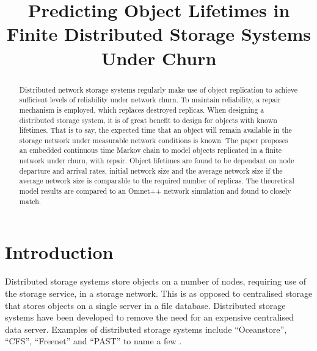 \documentclass[10pt,a4paper,conference]{IEEEtran}
\begin{document}
%
\title{Predicting Object Lifetimes in Finite Distributed Storage Systems Under Churn}

\author{}

\maketitle

\begin{abstract}
Distributed network storage systems regularly make use of object replication to achieve sufficient levels of reliability under network churn. To maintain reliability, a repair mechanism is employed, which replaces destroyed replicas. When designing a distributed storage system, it is of great benefit to design for objects with known lifetimes. That is to say, the expected time that an object will remain available in the storage network under measurable network conditions is known. The paper proposes an embedded continuous time Markov chain to model objects replicated in a finite network under churn, with repair. Object lifetimes are found to be dependant on node departure and arrival rates, initial network size and the average network size if the average network size is comparable to the required number of replicas. The theoretical model results are compared to an Omnet++ network simulation and found to closely match.
\end{abstract}

\section{Introduction}
\label{introduction}

Distributed storage systems store objects on a number of nodes, requiring use of the storage service, in a storage network. This is as opposed to centralised storage that stores objects on a single server in a file database. Distributed storage systems have been developed to remove the need for an expensive centralised data server. Examples of distributed storage systems include ``Oceanstore'', ``CFS'', ``Freenet'' and ``PAST'' to name a few \cite{distributed_storage_survey}.
\end{document}
